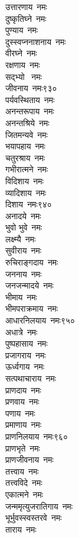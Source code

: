 \begin{multicols}{2}
\begin{flushleft}
उत्तारणाय~नमः\\
दुष्कृतिघ्ने~नमः\\
पुण्याय~नमः\\
दुस्स्वप्ननाशनाय~नमः\\
वीरघ्ने~नमः\\
रक्षणाय~नमः\\
सद्भ्यो ~नमः\\
जीवनाय~नमः\hfill ९३०\\
पर्यवस्थिताय~नमः\\
अनन्तरूपाय~नमः\\
अनन्तश्रिये~नमः\\
जितमन्यवे~नमः\\
भयापहाय~नमः\\
चतुरश्राय~नमः\\
गभीरात्मने~नमः\\
विदिशाय~नमः\\
व्यादिशाय~नमः\\
दिशाय~नमः\hfill ९४०\\
अनादये~नमः\\
भुवो भुवे~नमः\\
लक्ष्म्यै~नमः\\
सुवीराय~नमः\\
रुचिराङ्गदाय~नमः\\
जननाय~नमः\\
जनजन्मादये~नमः\\
भीमाय~नमः\\
भीमपराक्रमाय~नमः\\
आधारनिलयाय~नमः\hfill ९५०\\
अधात्रे~नमः\\
पुष्पहासाय~नमः\\
प्रजागराय~नमः\\
ऊर्ध्वगाय~नमः\\
सत्पथाचाराय~नमः\\
प्राणदाय~नमः\\
प्रणवाय~नमः\\
पणाय~नमः\\
प्रमाणाय~नमः\\
प्राणनिलयाय~नमः\hfill ९६०\\
प्राणभृते~नमः\\
प्राणजीवनाय~नमः\\
तत्त्वाय~नमः\\
तत्त्वविदे~नमः\\
एकात्मने~नमः\\
जन्ममृत्युजरातिगाय~नमः\\
भूर्भुवस्स्वस्तरवे~नमः\\
ताराय~नमः\\

\end{flushleft}
\end{multicols}
